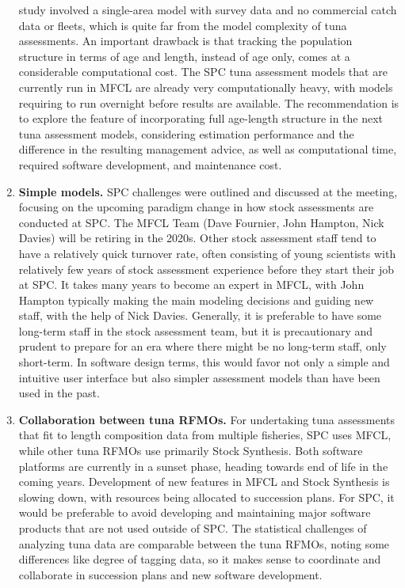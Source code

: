 \documentclass{SCreport}
\begin{document}
\begin{enumerate}
  study involved a single-area model with survey data and no commercial catch
  data or fleets, which is quite far from the model complexity of tuna
  assessments. An important drawback is that tracking the population structure
  in terms of age and length, instead of age only, comes at a considerable
  computational cost. The SPC tuna assessment models that are currently run in
  MFCL are already very computationally heavy, with models requiring to run
  overnight before results are available. The recommendation is to explore the
  feature of incorporating full age-length structure in the next tuna assessment
  models, considering estimation performance and the difference in the resulting
  management advice, as well as computational time, required software
  development, and maintenance cost.
  \item \textbf{Simple models.} SPC challenges were outlined and discussed at
  the meeting, focusing on the upcoming paradigm change in how stock assessments
  are conducted at SPC. The MFCL Team (Dave Fournier, John Hampton, Nick Davies)
  will be retiring in the 2020s. Other stock assessment staff tend to have a
  relatively quick turnover rate, often consisting of young scientists with
  relatively few years of stock assessment experience before they start their
  job at SPC. It takes many years to become an expert in MFCL, with John Hampton
  typically making the main modeling decisions and guiding new staff, with the
  help of Nick Davies. Generally, it is preferable to have some long-term staff
  in the stock assessment team, but it is precautionary and prudent to prepare
  for an era where there might be no long-term staff, only short-term. In
  software design terms, this would favor not only a simple and intuitive user
  interface but also simpler assessment models than have been used in the past.
  \item \textbf{Collaboration between tuna
    RFMOs.}\label{item:collaboration-rfmos} For undertaking tuna assessments
  that fit to length composition data from multiple fisheries, SPC uses MFCL,
  while other tuna RFMOs use primarily Stock Synthesis. Both software platforms
  are currently in a sunset phase, heading towards end of life in the coming
  years. Development of new features in MFCL and Stock Synthesis is slowing
  down, with resources being allocated to succession plans. For SPC, it would be
  preferable to avoid developing and maintaining major software products that
  are not used outside of SPC. The statistical challenges of analyzing tuna data
  are comparable between the tuna RFMOs, noting some differences like degree of
  tagging data, so it makes sense to coordinate and collaborate in succession
  plans and new software development.
\end{enumerate}
\end{document}
